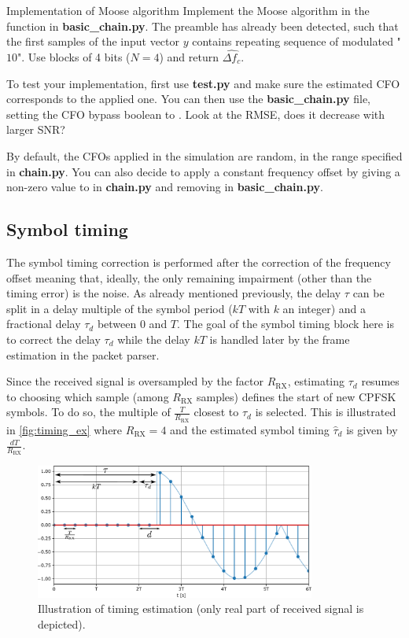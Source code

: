 \begin{bclogo}[couleur = gray!20, arrondi = 0.2, logo=\bccrayon]{Implementation of Moose algorithm}
Implement the Moose algorithm in the  function in \textbf{basic\_chain.py}. The preamble has already been detected, such that the first samples of the input vector $y$ contains repeating sequence of modulated "$10$". Use blocks of 4 bits ($N=4$) and return $\widehat{\Delta f_c}$.

To test your implementation, first use \textbf{test.py} and make sure the estimated CFO corresponds to the applied one. You can then use the \textbf{basic\_chain.py} file, setting the CFO bypass boolean to . Look at the RMSE, does it decrease with larger SNR?

By default, the CFOs applied in the simulation are random, in the range specified in \textbf{chain.py}. You can also decide to apply a constant frequency offset by giving a non-zero value to  in \textbf{chain.py} and removing  in \textbf{basic\_chain.py}.
\end{bclogo}



\subsection{Symbol timing}
The symbol timing correction is performed after the correction of the frequency offset meaning that, ideally, the only remaining impairment (other than the timing error) is the noise. As already mentioned previously, the delay $\tau$ can be split in a delay multiple of the symbol period ($kT$ with $k$ an integer) and a fractional delay $\tau_d$ between 0 and $T$. The goal of the symbol timing block here is to correct the delay $\tau_d$ while the delay $kT$ is handled later by the frame estimation in the packet parser.

Since the received signal is oversampled by the factor $R_{\text{RX}}$, estimating $\tau_d$ resumes to choosing which sample (among $R_{\text{RX}}$ samples) defines the start of new CPFSK symbols. To do so, the multiple of $\frac{T}{R_{\text{RX}}}$
closest to $\tau_d$ is selected. This is illustrated in \autoref{fig:timing_ex} where $R_{\text{RX}}=4$ and the estimated symbol timing $\hat{\tau}_d$ is given by $\frac{dT}{R_{\text{RX}}}$.

\begin{figure}[H]
    \centering
    \includegraphics[width=0.82\textwidth]{figures/drawing_timing.pdf}
    \caption{Illustration of timing estimation (only real part of received signal is depicted).}
    \label{fig:timing_ex}
\end{figure}

